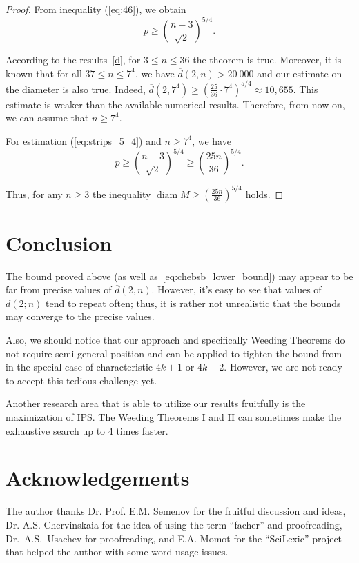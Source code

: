 \documentclass[a4paper,14pt]{article} %
\theoremstyle{plain}
\theoremstyle{definition}
\begin{document}
\begin{proof}
	From inequality (\ref{eq:46}), we obtain
	\begin{equation}
		\label{eq:strips_5_4}
		p \geq \left( \frac{n -3}{\sqrt{2}} \right)^{5/4}
		.
	\end{equation}

	According to the results~\eqref{d}, for $3 \leq n \leq 36$ the theorem is true.
	Moreover, it is known that for all $37 \leq n \leq 7^4$, we have $\overline{d}(2, n) > 20\ 000$  and our estimate on the diameter is also true.
	Indeed, $\overline{d}(2, 7^4) \geq \left(\frac{25}{36}\cdot 7^4\right)^{5/4} \approx 10,655$.
	This estimate is weaker than the available numerical results. Therefore, from now on, we can assume that $n \geq 7^4$.

	For estimation (\ref{eq:strips_5_4}) and $n \geq 7^4$, we have
	\begin{equation}
		\label{eq:strips_5_4_7}
		p \geq \left( \frac{n -3}{\sqrt{2}} \right)^{5/4}  \geq \left( \frac{25n}{36} \right)^{5/4}
		.
	\end{equation}

	Thus, for any $n \geq 3$ the inequality $
		\operatorname{diam} M \geq \left( \frac{25n}{36} \right)^{5/4}
	$ holds.
\end{proof}



\section{Conclusion}
	The bound proved above (as well as~\eqref{eq:chebsb_lower_bound}) may appear to be far from precise values of $\overline{d}(2,n)$.
	However, it's easy to see that values of $d(2;n)$ tend to repeat often;
	thus, it is rather not unrealistic that the bounds may converge to the precise values.

	Also, we should notice that our approach and  specifically Weeding Theorems do not require semi-general position and can be applied to tighten the bound from~\cite{my-pps-linear-bound-2019}
	in the special case of characteristic $4k+1$ or $4k+2$.
	However, we are not ready to accept this tedious challenge yet.

	Another research area that is able to utilize our results fruitfully is the maximization of IPS.
	The Weeding Theorems I and II can sometimes make the exhaustive search up to 4 times faster.




\section{Acknowledgements}
The author thanks Dr. Prof. E.M. Semenov for the fruitful discussion and ideas,
Dr. A.S. Chervinskaia for the idea of using the term ``facher'' and proofreading,
Dr.~A.S.~Usachev for proofreading,
and E.A. Momot for the ``SciLexic'' project that helped the author with some word usage issues.


\printbibliography
\end{document}
